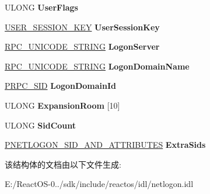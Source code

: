 \begin{DoxyCompactItemize}
\mbox{\label{struct___n_e_t_l_o_g_o_n___v_a_l_i_d_a_t_i_o_n___s_a_m___i_n_f_o2_a86927fccacf62f2e8ed84e6a408b5515}} 
U\+L\+O\+NG {\bfseries User\+Flags}
\item 
\mbox{\label{struct___n_e_t_l_o_g_o_n___v_a_l_i_d_a_t_i_o_n___s_a_m___i_n_f_o2_a16c4a385cd0fcc57ed3045749708524c}} 
\hyperlink{struct___u_s_e_r___s_e_s_s_i_o_n___k_e_y}{U\+S\+E\+R\+\_\+\+S\+E\+S\+S\+I\+O\+N\+\_\+\+K\+EY} {\bfseries User\+Session\+Key}
\item 
\mbox{\label{struct___n_e_t_l_o_g_o_n___v_a_l_i_d_a_t_i_o_n___s_a_m___i_n_f_o2_aaf4dea7049e1572179f4d1259814be1e}} 
\hyperlink{struct___r_p_c___u_n_i_c_o_d_e___s_t_r_i_n_g}{R\+P\+C\+\_\+\+U\+N\+I\+C\+O\+D\+E\+\_\+\+S\+T\+R\+I\+NG} {\bfseries Logon\+Server}
\item 
\mbox{\label{struct___n_e_t_l_o_g_o_n___v_a_l_i_d_a_t_i_o_n___s_a_m___i_n_f_o2_aafa65fb4f100c6df04e3ad5e40fa173d}} 
\hyperlink{struct___r_p_c___u_n_i_c_o_d_e___s_t_r_i_n_g}{R\+P\+C\+\_\+\+U\+N\+I\+C\+O\+D\+E\+\_\+\+S\+T\+R\+I\+NG} {\bfseries Logon\+Domain\+Name}
\item 
\mbox{\label{struct___n_e_t_l_o_g_o_n___v_a_l_i_d_a_t_i_o_n___s_a_m___i_n_f_o2_a5a729ac1536a9293f3a576db971af496}} 
\hyperlink{struct___r_p_c___s_i_d}{P\+R\+P\+C\+\_\+\+S\+ID} {\bfseries Logon\+Domain\+Id}
\item 
\mbox{\label{struct___n_e_t_l_o_g_o_n___v_a_l_i_d_a_t_i_o_n___s_a_m___i_n_f_o2_ae85528eee8b4a758722b5bcac33628c1}} 
U\+L\+O\+NG {\bfseries Expansion\+Room} \mbox{[}10\mbox{]}
\item 
\mbox{\label{struct___n_e_t_l_o_g_o_n___v_a_l_i_d_a_t_i_o_n___s_a_m___i_n_f_o2_a0cfab93f8761729903e83051ac8ce60a}} 
U\+L\+O\+NG {\bfseries Sid\+Count}
\item 
\mbox{\label{struct___n_e_t_l_o_g_o_n___v_a_l_i_d_a_t_i_o_n___s_a_m___i_n_f_o2_a60662190a4c3d2b8f6624eccbb66af65}} 
\hyperlink{struct___n_e_t_l_o_g_o_n___s_i_d___a_n_d___a_t_t_r_i_b_u_t_e_s}{P\+N\+E\+T\+L\+O\+G\+O\+N\+\_\+\+S\+I\+D\+\_\+\+A\+N\+D\+\_\+\+A\+T\+T\+R\+I\+B\+U\+T\+ES} {\bfseries Extra\+Sids}
\end{DoxyCompactItemize}


该结构体的文档由以下文件生成\+:\begin{DoxyCompactItemize}
\item 
E\+:/\+React\+O\+S-\/0../sdk/include/reactos/idl/netlogon.\+idl\end{DoxyCompactItemize}

